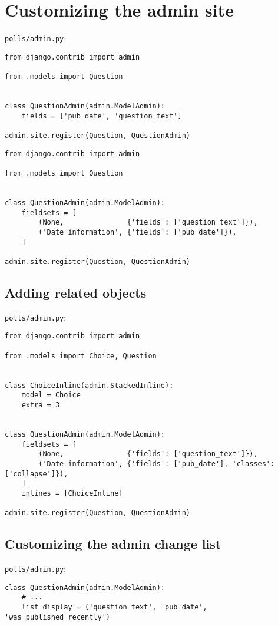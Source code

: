 
\chapter{Customizing the admin site}

\verb|polls/admin.py|:
\begin{lstlisting}
from django.contrib import admin

from .models import Question


class QuestionAdmin(admin.ModelAdmin):
    fields = ['pub_date', 'question_text']

admin.site.register(Question, QuestionAdmin)
\end{lstlisting}

\begin{lstlisting}
from django.contrib import admin

from .models import Question


class QuestionAdmin(admin.ModelAdmin):
    fieldsets = [
        (None,               {'fields': ['question_text']}),
        ('Date information', {'fields': ['pub_date']}),
    ]

admin.site.register(Question, QuestionAdmin)
\end{lstlisting}


\section{Adding related objects}
\verb|polls/admin.py|:
\begin{lstlisting}
from django.contrib import admin

from .models import Choice, Question


class ChoiceInline(admin.StackedInline):
    model = Choice
    extra = 3


class QuestionAdmin(admin.ModelAdmin):
    fieldsets = [
        (None,               {'fields': ['question_text']}),
        ('Date information', {'fields': ['pub_date'], 'classes': ['collapse']}),
    ]
    inlines = [ChoiceInline]

admin.site.register(Question, QuestionAdmin)
\end{lstlisting}


\section{Customizing the admin change list}

\verb|polls/admin.py|:
\begin{lstlisting}
class QuestionAdmin(admin.ModelAdmin):
    # ...
    list_display = ('question_text', 'pub_date', 'was_published_recently')
  \end{lstlisting}


